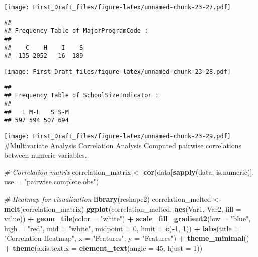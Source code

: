 \documentclass[
]{article}
\newenvironment{Shaded}{\begin{snugshade}}{\end{snugshade}}
\newcommand{\AttributeTok}[1]{\textcolor[rgb]{0.13,0.29,0.53}{#1}}
\newcommand{\CommentTok}[1]{\textcolor[rgb]{0.56,0.35,0.01}{\textit{#1}}}
\newcommand{\DecValTok}[1]{\textcolor[rgb]{0.00,0.00,0.81}{#1}}
\newcommand{\FunctionTok}[1]{\textcolor[rgb]{0.13,0.29,0.53}{\textbf{#1}}}
\newcommand{\NormalTok}[1]{#1}
\newcommand{\OtherTok}[1]{\textcolor[rgb]{0.56,0.35,0.01}{#1}}
\newcommand{\SpecialCharTok}[1]{\textcolor[rgb]{0.81,0.36,0.00}{\textbf{#1}}}
\newcommand{\StringTok}[1]{\textcolor[rgb]{0.31,0.60,0.02}{#1}}
\begin{document}
\texttt{[image: First\_Draft\_files/figure-latex/unnamed-chunk-23-27.pdf]}

\begin{verbatim}
## 
## Frequency Table of MajorProgramCode :
## 
##    C    H    I    S 
##  135 2052   16  189
\end{verbatim}

\texttt{[image: First\_Draft\_files/figure-latex/unnamed-chunk-23-28.pdf]}

\begin{verbatim}
## 
## Frequency Table of SchoolSizeIndicator :
## 
##   L M-L   S S-M 
## 597 594 507 694
\end{verbatim}

\texttt{[image: First\_Draft\_files/figure-latex/unnamed-chunk-23-29.pdf]}
\#Multivariate Analysis Correlation Analysis Computed pairwise
correlations between numeric variables.

\begin{Shaded}
\begin{Highlighting}[]
\CommentTok{\# Correlation matrix}
\NormalTok{correlation\_matrix }\OtherTok{\textless{}{-}} \FunctionTok{cor}\NormalTok{(data[}\FunctionTok{sapply}\NormalTok{(data, is.numeric)], }\AttributeTok{use =} \StringTok{"pairwise.complete.obs"}\NormalTok{)}

\CommentTok{\# Heatmap for visualization}
\FunctionTok{library}\NormalTok{(reshape2)}
\NormalTok{correlation\_melted }\OtherTok{\textless{}{-}} \FunctionTok{melt}\NormalTok{(correlation\_matrix)}
\FunctionTok{ggplot}\NormalTok{(correlation\_melted, }\FunctionTok{aes}\NormalTok{(Var1, Var2, }\AttributeTok{fill =}\NormalTok{ value)) }\SpecialCharTok{+}
  \FunctionTok{geom\_tile}\NormalTok{(}\AttributeTok{color =} \StringTok{"white"}\NormalTok{) }\SpecialCharTok{+}
  \FunctionTok{scale\_fill\_gradient2}\NormalTok{(}\AttributeTok{low =} \StringTok{"blue"}\NormalTok{, }\AttributeTok{high =} \StringTok{"red"}\NormalTok{, }\AttributeTok{mid =} \StringTok{"white"}\NormalTok{, }\AttributeTok{midpoint =} \DecValTok{0}\NormalTok{, }\AttributeTok{limit =} \FunctionTok{c}\NormalTok{(}\SpecialCharTok{{-}}\DecValTok{1}\NormalTok{, }\DecValTok{1}\NormalTok{)) }\SpecialCharTok{+}
  \FunctionTok{labs}\NormalTok{(}\AttributeTok{title =} \StringTok{"Correlation Heatmap"}\NormalTok{, }\AttributeTok{x =} \StringTok{"Features"}\NormalTok{, }\AttributeTok{y =} \StringTok{"Features"}\NormalTok{) }\SpecialCharTok{+}
  \FunctionTok{theme\_minimal}\NormalTok{() }\SpecialCharTok{+}
  \FunctionTok{theme}\NormalTok{(}\AttributeTok{axis.text.x =} \FunctionTok{element\_text}\NormalTok{(}\AttributeTok{angle =} \DecValTok{45}\NormalTok{, }\AttributeTok{hjust =} \DecValTok{1}\NormalTok{))}
\end{Highlighting}
\end{Shaded}
\end{document}
